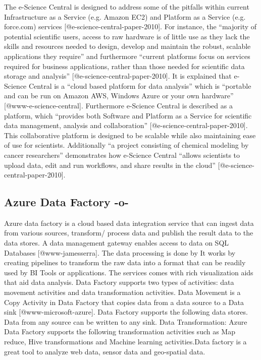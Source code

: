 The e-Science Central is designed to address some of the pitfalls
within current Infrastructure as a Service (e.g.  Amazon EC2) and
Platform as a Service (e.g. force.com)
services [@e-science-central-paper-2010]. For instance, the
``majority of potential scientific users, access to raw hardware is of
little use as they lack the skills and resources needed to design,
develop and maintain the robust, scalable applications they require''
and furthermore ``current platforms focus on services required for
business applications, rather than those needed for scientific data
storage and analysis'' [@e-science-central-paper-2010]. It is
explained that e-Science Central is a ``cloud based platform for data
analysis'' which is ``portable and can be run on Amazon AWS, Windows
Azure or your own hardware'' [@www-e-science-central].
Furthermore e-Science Central is described as a platform, which
``provides both Software and Platform as a Service for scientific data
management, analysis and collaboration''
 [@e-science-central-paper-2010]. This collaborative platform is
designed to be scalable while also maintaining ease of use for
scientists.  Additionally ``a project consisting of chemical modeling
by cancer researchers'' demonstrates how e-Science Central ``allows
scientists to upload data, edit and run workflows, and share results
in the cloud'' [@e-science-central-paper-2010].



\subsection{Azure Data Factory -o-}
    
Azure data factory is a cloud based data integration service that can
ingest data from various sources, transform/ process data and publish
the result data to the data stores. A data management gateway enables
access to data on SQL Databases [@www-jamesserra]. The data
processing is done by It works by creating pipelines to transform the
raw data into a format that can be readily used by BI Tools or
applications. The services comes with rich visualization aids that aid
data analysis. Data Factory supports two types of activities: data
movement activities and data transformation activities. Data Movement
is a Copy Activity in Data Factory that copies data from a data source
to a Data sink [@www-microsoft-azure]. Data Factory supports the
following data stores. Data from any source can be written to any
sink.  Data Transformation: Azure Data Factory supports the following
transformation activities such as Map reduce, Hive transformations and
Machine learning activities.Data factory is a great tool to analyze
web data, sensor data and geo-spatial data.



